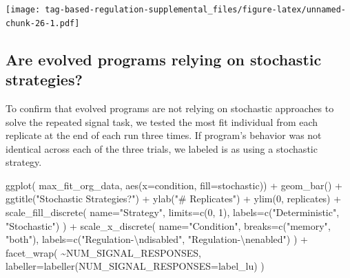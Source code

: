 \documentclass[
]{book}
\newenvironment{Shaded}{\begin{snugshade}}{\end{snugshade}}
\newcommand{\AttributeTok}[1]{\textcolor[rgb]{0.77,0.63,0.00}{#1}}
\newcommand{\DecValTok}[1]{\textcolor[rgb]{0.00,0.00,0.81}{#1}}
\newcommand{\FunctionTok}[1]{\textcolor[rgb]{0.00,0.00,0.00}{#1}}
\newcommand{\NormalTok}[1]{#1}
\newcommand{\SpecialCharTok}[1]{\textcolor[rgb]{0.00,0.00,0.00}{#1}}
\newcommand{\StringTok}[1]{\textcolor[rgb]{0.31,0.60,0.02}{#1}}
\begin{document}
\texttt{[image: tag-based-regulation-supplemental\_files/figure-latex/unnamed-chunk-26-1.pdf]}

\hypertarget{are-evolved-programs-relying-on-stochastic-strategies}{%
\subsection{Are evolved programs relying on stochastic strategies?}\label{are-evolved-programs-relying-on-stochastic-strategies}}

To confirm that evolved programs are not relying on stochastic approaches to solve the repeated signal task,
we tested the most fit individual from each replicate at the end of each run three times.
If program's behavior was not identical across each of the three trials, we labeled is as using a stochastic strategy.

\begin{Shaded}
\begin{Highlighting}[]
\FunctionTok{ggplot}\NormalTok{( max\_fit\_org\_data, }\FunctionTok{aes}\NormalTok{(}\AttributeTok{x=}\NormalTok{condition, }\AttributeTok{fill=}\NormalTok{stochastic)) }\SpecialCharTok{+}
  \FunctionTok{geom\_bar}\NormalTok{() }\SpecialCharTok{+}
  \FunctionTok{ggtitle}\NormalTok{(}\StringTok{"Stochastic Strategies?"}\NormalTok{) }\SpecialCharTok{+}
  \FunctionTok{ylab}\NormalTok{(}\StringTok{"\# Replicates"}\NormalTok{) }\SpecialCharTok{+}
  \FunctionTok{ylim}\NormalTok{(}\DecValTok{0}\NormalTok{, replicates) }\SpecialCharTok{+}
  \FunctionTok{scale\_fill\_discrete}\NormalTok{(}
    \AttributeTok{name=}\StringTok{"Strategy"}\NormalTok{,}
    \AttributeTok{limits=}\FunctionTok{c}\NormalTok{(}\DecValTok{0}\NormalTok{, }\DecValTok{1}\NormalTok{),}
    \AttributeTok{labels=}\FunctionTok{c}\NormalTok{(}\StringTok{"Deterministic"}\NormalTok{, }\StringTok{"Stochastic"}\NormalTok{)}
\NormalTok{  ) }\SpecialCharTok{+}
  \FunctionTok{scale\_x\_discrete}\NormalTok{(}
    \AttributeTok{name=}\StringTok{"Condition"}\NormalTok{,}
    \AttributeTok{breaks=}\FunctionTok{c}\NormalTok{(}\StringTok{"memory"}\NormalTok{, }\StringTok{"both"}\NormalTok{),}
    \AttributeTok{labels=}\FunctionTok{c}\NormalTok{(}\StringTok{"Regulation{-}}\SpecialCharTok{\textbackslash{}n}\StringTok{disabled"}\NormalTok{, }\StringTok{"Regulation{-}}\SpecialCharTok{\textbackslash{}n}\StringTok{enabled"}\NormalTok{)}
\NormalTok{  ) }\SpecialCharTok{+}
  \FunctionTok{facet\_wrap}\NormalTok{(}
    \SpecialCharTok{\textasciitilde{}}\NormalTok{NUM\_SIGNAL\_RESPONSES,}
    \AttributeTok{labeller=}\FunctionTok{labeller}\NormalTok{(}\AttributeTok{NUM\_SIGNAL\_RESPONSES=}\NormalTok{label\_lu)}
\NormalTok{  )}
\end{Highlighting}
\end{Shaded}
\end{document}

